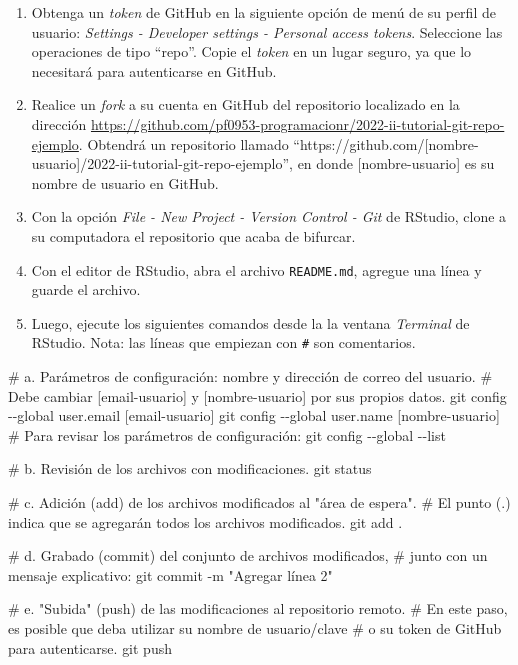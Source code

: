\documentclass[
  letterpaper,
  DIV=11,
  numbers=noendperiod]{scrreprt}
\newenvironment{Shaded}{\begin{snugshade}}{\end{snugshade}}
\newcommand{\NormalTok}[1]{\textcolor[rgb]{0.00,0.23,0.31}{#1}}
\providecommand{\tightlist}{%
  \setlength{\itemsep}{0pt}\setlength{\parskip}{0pt}}\usepackage{longtable,booktabs,array}
\begin{document}
\begin{enumerate}
\def\labelenumi{\arabic{enumi}.}
\setcounter{enumi}{-1}
\tightlist
\item
  Obtenga un \emph{token} de GitHub en la siguiente opción de menú de su
  perfil de usuario: \emph{Settings - Developer settings - Personal
  access tokens}. Seleccione las operaciones de tipo ``repo''. Copie el
  \emph{token} en un lugar seguro, ya que lo necesitará para
  autenticarse en GitHub.
\item
  Realice un \emph{fork} a su cuenta en GitHub del repositorio
  localizado en la dirección
  \url{https://github.com/pf0953-programacionr/2022-ii-tutorial-git-repo-ejemplo}.
  Obtendrá un repositorio llamado
  ``https://github.com/{[}nombre-usuario{]}/2022-ii-tutorial-git-repo-ejemplo'',
  en donde {[}nombre-usuario{]} es su nombre de usuario en GitHub.
\item
  Con la opción \emph{File - New Project - Version Control - Git} de
  RStudio, clone a su computadora el repositorio que acaba de bifurcar.
\item
  Con el editor de RStudio, abra el archivo \texttt{README.md}, agregue
  una línea y guarde el archivo.
\item
  Luego, ejecute los siguientes comandos desde la la ventana
  \emph{Terminal} de RStudio. Nota: las líneas que empiezan con
  \texttt{\#} son comentarios.
\end{enumerate}

\begin{Shaded}
\begin{Highlighting}[]
\NormalTok{\# a. Parámetros de configuración: nombre y dirección de correo del usuario.}
\NormalTok{\#    Debe cambiar [email{-}usuario] y [nombre{-}usuario] por sus propios datos.}
\NormalTok{git config {-}{-}global user.email [email{-}usuario]}
\NormalTok{git config {-}{-}global user.name [nombre{-}usuario]}
\NormalTok{\# Para revisar los parámetros de configuración:}
\NormalTok{git config {-}{-}global {-}{-}list}

\NormalTok{\# b. Revisión de los archivos con modificaciones.}
\NormalTok{git status}

\NormalTok{\# c. Adición (add) de los archivos modificados al "área de espera".}
\NormalTok{\#    El punto (.) indica que se agregarán todos los archivos modificados.}
\NormalTok{git add .}

\NormalTok{\# d. Grabado (commit) del conjunto de archivos modificados,}
\NormalTok{\#    junto con un mensaje explicativo:}
\NormalTok{git commit {-}m "Agregar línea 2"}

\NormalTok{\# e. "Subida" (push) de las modificaciones al repositorio remoto.}
\NormalTok{\#    En este paso, es posible que deba utilizar su nombre de usuario/clave}
\NormalTok{\#    o su token de GitHub para autenticarse.}
\NormalTok{git push}
\end{Highlighting}
\end{Shaded}
\end{document}
